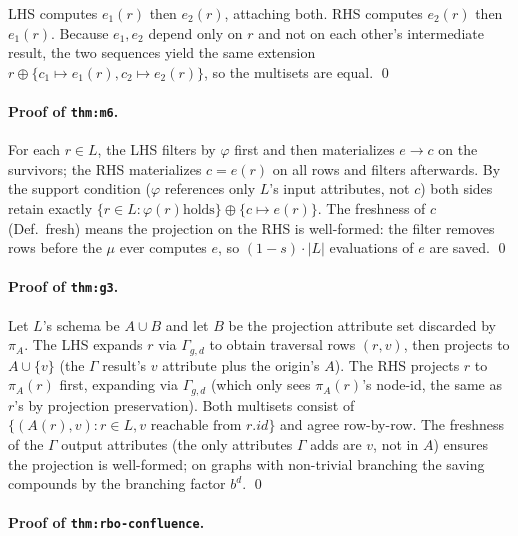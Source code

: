 \documentclass[sigconf]{acmart}
\theoremstyle{plain}
\theoremstyle{definition}
\theoremstyle{remark}
\begin{document}
LHS computes $e_1(r)$ then $e_2(r)$, attaching both. RHS
computes $e_2(r)$ then $e_1(r)$. Because $e_1, e_2$ depend only
on $r$ and not on each other's intermediate result, the two
sequences yield the same extension $r \oplus \{c_1 \mapsto
e_1(r), c_2 \mapsto e_2(r)\}$, so the multisets are equal. \qed


\paragraph{Proof of \texttt{thm:m6}.}

For each $r \in L$, the LHS filters by $\varphi$ first and then
materializes $e \to c$ on the survivors; the RHS materializes
$c = e(r)$ on all rows and filters afterwards. By the support
condition ($\varphi$ references only $L$'s input attributes, not
$c$) both sides retain exactly $\{r \in L : \varphi(r) \text{
holds}\} \oplus \{c \mapsto e(r)\}$. The freshness of $c$
(Def.~fresh) means the projection on the RHS is well-formed:
the filter removes rows before the $\mu$ ever computes $e$, so
$(1 - s) \cdot |L|$ evaluations of $e$ are saved. \qed


\paragraph{Proof of \texttt{thm:g3}.}

Let $L$'s schema be $A \cup B$ and let $B$ be the projection
attribute set discarded by $\pi_A$. The LHS expands $r$ via
$\Gamma_{g,d}$ to obtain traversal rows $(r, v)$, then projects
to $A \cup \{v\}$ (the $\Gamma$ result's $v$ attribute plus the
origin's $A$). The RHS projects $r$ to $\pi_A(r)$ first,
expanding via $\Gamma_{g,d}$ (which only sees $\pi_A(r)$'s
node-id, the same as $r$'s by projection preservation). Both
multisets consist of $\{(A(r), v): r \in L, v \text{ reachable from } r.id\}$ and agree row-by-row. The freshness of
the $\Gamma$ output attributes (the only attributes $\Gamma$
adds are $v$, not in $A$) ensures the projection is
well-formed; on graphs with non-trivial branching the saving
compounds by the branching factor $b^d$. \qed


\paragraph{Proof of \texttt{thm:rbo-confluence}.}
\end{document}
